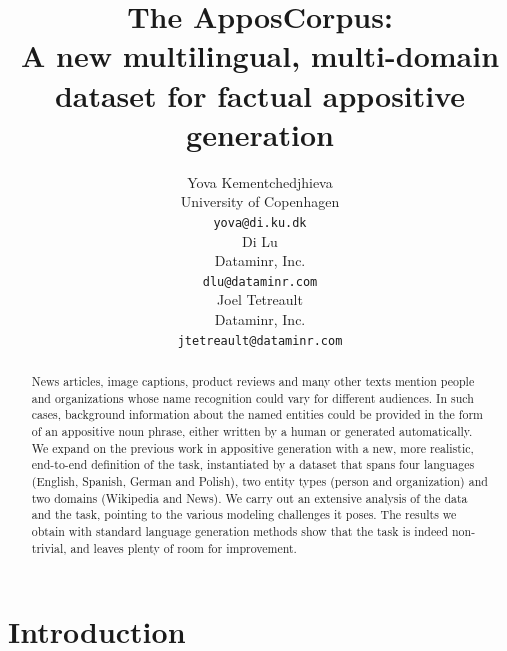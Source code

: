 \documentclass[11pt]{article}
\title{The ApposCorpus:\\ A new multilingual, multi-domain dataset for factual appositive generation}
\author{Yova Kementchedjhieva \\
  University of Copenhagen\\
  {\tt yova@di.ku.dk} \\\And
  Di Lu \\
  Dataminr, Inc.\\
  {\tt dlu@dataminr.com} \\\And
  Joel Tetreault \\
  Dataminr, Inc.\\
  {\tt jtetreault@dataminr.com}}
\date{}
\begin{document}
\maketitle
\begin{abstract}
News articles, image captions, product reviews and many other texts mention people and organizations whose name recognition could vary for different audiences. In such cases, background information about the named entities could be provided in the form of an appositive noun phrase, either written by a human or generated automatically.
We expand on the previous work in appositive generation with a new, more realistic, end-to-end definition of the task, instantiated by a dataset that spans four languages (English, Spanish, German and Polish), two entity types (person and organization) and two domains (Wikipedia and News). 
We carry out an extensive analysis of the data and the task, pointing to the various modeling challenges it poses. The results we obtain with standard language generation methods show that the task is indeed non-trivial, and leaves plenty of room for improvement.  
\end{abstract}

\section{Introduction}

\end{document}
